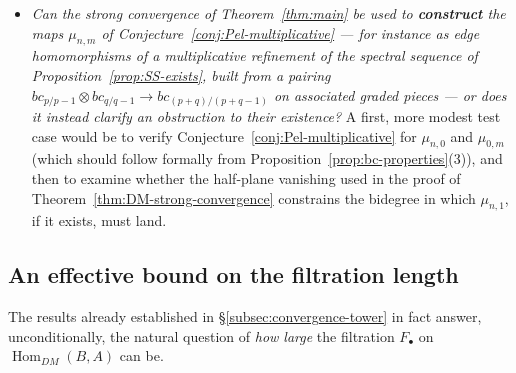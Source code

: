 \documentclass[12pt,a4paper]{article}
\theoremstyle{definition}
\newcommand{\Hom}{\operatorname{Hom}}
\begin{document}
\begin{itemize}
\item[] \emph{Can the strong convergence of Theorem~\ref{thm:main} be used to
  \textbf{construct} the maps $\mu_{n,m}$ of
  Conjecture~\ref{conj:Pel-multiplicative} — for instance as edge homomorphisms
  of a multiplicative refinement of the spectral sequence of
  Proposition~\ref{prop:SS-exists}, built from a pairing
  $bc_{p/p-1}\otimes bc_{q/q-1}\to bc_{(p+q)/(p+q-1)}$ on associated graded
  pieces — or does it instead clarify an obstruction to their existence?}  A
  first, more modest test case would be to verify Conjecture~\ref{conj:Pel-multiplicative}
  for $\mu_{n,0}$ and $\mu_{0,m}$ (which should follow formally from
  Proposition~\ref{prop:bc-properties}(3)), and then to examine whether the
  half-plane vanishing used in the proof of
  Theorem~\ref{thm:DM-strong-convergence} constrains the bidegree in which
  $\mu_{n,1}$, if it exists, must land.
\end{itemize}

\subsection*{An effective bound on the filtration length}

The results already established in \S\ref{subsec:convergence-tower} in fact
answer, unconditionally, the natural question of \emph{how large} the
filtration $F_\bullet$ on $\Hom_{DM}(B,A)$ can be.
\end{document}
